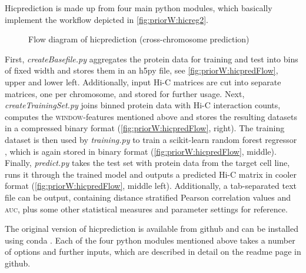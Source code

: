 Hicprediction is made up from four main python modules, which basically implement the workflow depicted in 
\autoref{fig:priorW:hicreg2}. 
\begin{figure}[htb]
 \small
 \centering
 \caption{Flow diagram of hicprediction (cross-chromosome prediction)}
 \label{fig:priorW:hicpredFlow}
\end{figure}
First, \emph{createBasefile.py} \cite{hicpred2020bf} aggregates the protein data for training and test into bins of fixed width and stores them in an h5py file, 
see 
\autoref{fig:priorW:hicpredFlow}, upper and lower left.
Additionally, input Hi-C matrices are cut into separate matrices, one per chromosome, and stored for further usage.
Next, \emph{createTrainingSet.py} \cite{hicpred2020cts} joins binned protein data with Hi-C interaction counts, computes the \textsc{window}-features mentioned 
above and 
stores the resulting datasets in a compressed binary format (\autoref{fig:priorW:hicpredFlow}, right).
The training dataset is then used by \emph{training.py} \cite{hicpred2020tr} to train a scikit-learn random forest regressor \cite{Pedregosa2011}, 
which is again stored in binary format (\autoref{fig:priorW:hicpredFlow}, middle).
Finally, \emph{predict.py} \cite{hicpred2020pr} takes the test set with protein data from the target cell line, 
runs it through the trained model and outputs a predicted Hi-C matrix in cooler format (\autoref{fig:priorW:hicpredFlow}, middle left).
Additionally, a tab-separated text file can be output, containing distance stratified Pearson correlation values and \textsc{auc},
plus some other statistical measures and parameter settings for reference. 

The original version of hicprediction is available from github \cite{BajoratHicpredWWW2019} and can be 
installed using conda \cite{minicondaWWW2019}.
Each of the four python modules mentioned above takes a number of options and further inputs, 
which are described in detail on the readme page in github.